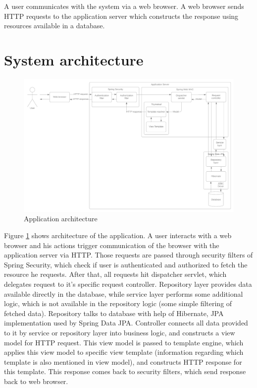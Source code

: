 \documentclass[a4paper,twoside,12pt]{book}
\begin{document}
    A user communicates with the system via a web browser. 
    A web browser sends HTTP requests to the application server which constructs the response using resources available in a database.

  \section{System architecture}
    \begin{figure}[h]
      \includegraphics[width=\linewidth]{architecture_diagram.png}
      \caption{Application architecture}
      \label{fig:architecture_diagram}
    \end{figure}

    Figure \ref{fig:architecture_diagram} shows architecture of the application. 
    A user interacts with a web browser and his actions trigger communication of the browser with the application server via HTTP.
    Those requests are passed through security filters of Spring Security, which check if user is authenticated and authorized to fetch the resource he requests.
    After that, all requests hit dispatcher servlet, which delegates request to it's specific request controller.
    Repository layer provides data available directly in the database, 
    while service layer performs some additional logic, which is not available in the repository logic (some simple filtering of fetched data).
    Repository talks to database with help of Hibernate, JPA implementation used by Spring Data JPA. 
    Controller connects all data provided to it by service or repository layer into business logic, and constructs a view model for HTTP request.
    This view model is passed to template engine, 
    which applies this view model to specific view template (information regarding which template is also mentioned in view model), 
    and constructs HTTP response for this template.
    This response comes back to security filters, which send response back to web browser.
    \pagebreak
\end{document}

